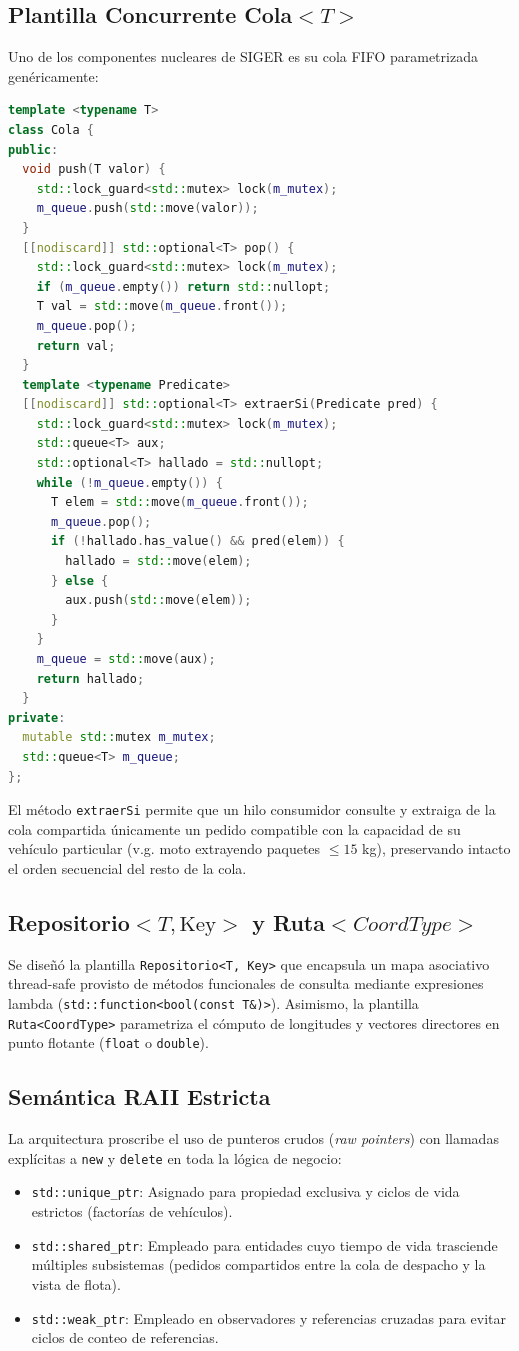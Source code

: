 \documentclass[conference]{IEEEtran}
\begin{document}
\subsection{Plantilla Concurrente Cola$<T>$}
Uno de los componentes nucleares de SIGER es su cola FIFO parametrizada genéricamente:
\begin{lstlisting}[language=C++]
template <typename T>
class Cola {
public:
  void push(T valor) {
    std::lock_guard<std::mutex> lock(m_mutex);
    m_queue.push(std::move(valor));
  }
  [[nodiscard]] std::optional<T> pop() {
    std::lock_guard<std::mutex> lock(m_mutex);
    if (m_queue.empty()) return std::nullopt;
    T val = std::move(m_queue.front());
    m_queue.pop();
    return val;
  }
  template <typename Predicate>
  [[nodiscard]] std::optional<T> extraerSi(Predicate pred) {
    std::lock_guard<std::mutex> lock(m_mutex);
    std::queue<T> aux;
    std::optional<T> hallado = std::nullopt;
    while (!m_queue.empty()) {
      T elem = std::move(m_queue.front());
      m_queue.pop();
      if (!hallado.has_value() && pred(elem)) {
        hallado = std::move(elem);
      } else {
        aux.push(std::move(elem));
      }
    }
    m_queue = std::move(aux);
    return hallado;
  }
private:
  mutable std::mutex m_mutex;
  std::queue<T> m_queue;
};
\end{lstlisting}
El método \texttt{extraerSi} permite que un hilo consumidor consulte y extraiga de la cola compartida únicamente un pedido compatible con la capacidad de su vehículo particular (v.g. moto extrayendo paquetes $\le 15$ kg), preservando intacto el orden secuencial del resto de la cola.

\subsection{Repositorio$<T, \text{Key}>$ y Ruta$<CoordType>$}
Se diseñó la plantilla \texttt{Repositorio<T, Key>} que encapsula un mapa asociativo thread-safe provisto de métodos funcionales de consulta mediante expresiones lambda (\texttt{std::function<bool(const T\&)>}). Asimismo, la plantilla \texttt{Ruta<CoordType>} parametriza el cómputo de longitudes y vectores directores en punto flotante (\texttt{float} o \texttt{double}).

\subsection{Semántica RAII Estricta}
La arquitectura proscribe el uso de punteros crudos (\textit{raw pointers}) con llamadas explícitas a \texttt{new} y \texttt{delete} en toda la lógica de negocio:
\begin{itemize}
    \item \texttt{std::unique\_ptr}: Asignado para propiedad exclusiva y ciclos de vida estrictos (factorías de vehículos).
    \item \texttt{std::shared\_ptr}: Empleado para entidades cuyo tiempo de vida trasciende múltiples subsistemas (pedidos compartidos entre la cola de despacho y la vista de flota).
    \item \texttt{std::weak\_ptr}: Empleado en observadores y referencias cruzadas para evitar ciclos de conteo de referencias.
\end{itemize}
\end{document}
